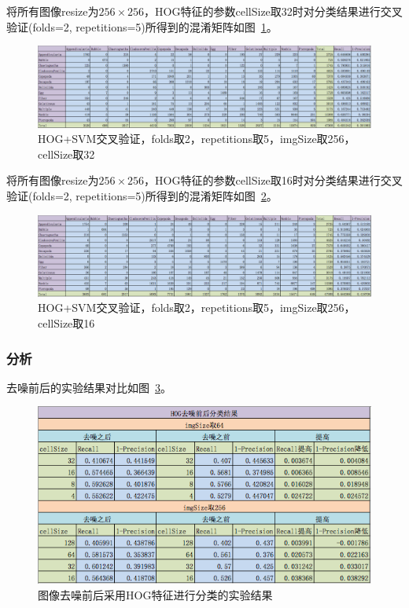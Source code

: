 \documentclass[12pt]{article}
\begin{document}
将所有图像resize为$256 \times 256$，HOG特征的参数cellSize取32时对分类结果进行交叉验证(folds=2, repetitions=5)所得到的混淆矩阵如图~\ref{fig:HOG-SVM-2-folds-5-repetitions-32-256-noNoise}。
\begin{figure}[!ht]
\centering
\includegraphics[width=1.0\linewidth]{HOG-SVM-2-folds-5-repetitions-32-256-noNoise}
\caption{HOG+SVM交叉验证，folds取2，repetitions取5，imgSize取256，cellSize取32}
\label{fig:HOG-SVM-2-folds-5-repetitions-32-256-noNoise}
\end{figure}

将所有图像resize为$256 \times 256$，HOG特征的参数cellSize取16时对分类结果进行交叉验证(folds=2, repetitions=5)所得到的混淆矩阵如图~\ref{fig:HOG-SVM-2-folds-5-repetitions-16-256-noNoise}。
\begin{figure}[!ht]
\centering
\includegraphics[width=1.0\linewidth]{HOG-SVM-2-folds-5-repetitions-16-256-noNoise}
\caption{HOG+SVM交叉验证，folds取2，repetitions取5，imgSize取256，cellSize取16}
\label{fig:HOG-SVM-2-folds-5-repetitions-16-256-noNoise}
\end{figure}

\subsubsection{分析}
去噪前后的实验结果对比如图~\ref{fig:HOG-compare}。
\begin{figure}[!ht]
\centering
\includegraphics[width=0.45\linewidth]{HOG-compare}
\caption{图像去噪前后采用HOG特征进行分类的实验结果}
\label{fig:HOG-compare}
\end{figure}
\end{document}
